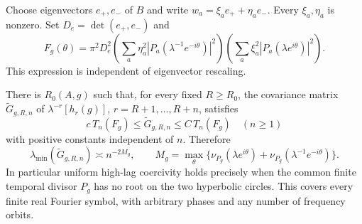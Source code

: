 Choose eigenvectors $e_+,e_-$ of $B$ and write
$w_a=\xi_a e_++\eta_a e_-$. Every $\xi_a,\eta_a$ is nonzero.
Set $D_e=\det(e_+,e_-)$ and
\[
 F_g(\theta)=\pi^2 D_e^2
 \left(\sum_a\eta_a^2|P_a(\lambda^{-1}e^{-i\theta})|^2\right)
 \left(\sum_a\xi_a^2|P_a(\lambda e^{i\theta})|^2\right).
\]
This expression is independent of eigenvector rescaling.
\begin{theorem}
\label{thm:general-symbol}
There is $R_0(A,g)$ such that, for every fixed $R\ge R_0$, the covariance
matrix $\widetilde G_{g,R,n}$ of $\lambda^{-r}[h_r(g)]$,
$r=R+1,\ldots,R+n$, satisfies
\[
 c\,T_n(F_g)\le\widetilde G_{g,R,n}\le C\,T_n(F_g)
 \quad(n\ge1)
\]
with positive constants independent of $n$. Therefore
\[
 \lambda_{\min}(\widetilde G_{g,R,n})\asymp n^{-2M_g},\qquad
 M_g=\max_\theta\{
 \nu_{P_g}(\lambda e^{i\theta})+
 \nu_{P_g}(\lambda^{-1}e^{-i\theta})\}.
\]
In particular uniform high-lag coercivity holds precisely when the common
finite temporal divisor $P_g$ has no root on the two hyperbolic circles.
This covers every finite real Fourier symbol, with arbitrary phases and any
number of frequency orbits.
\end{theorem}
